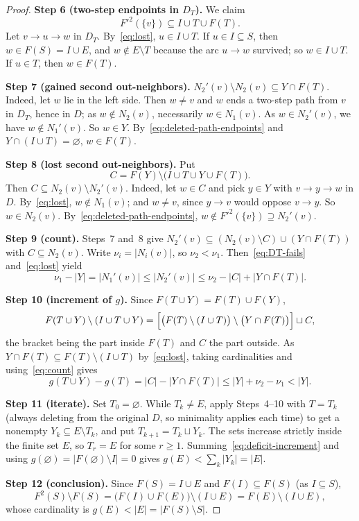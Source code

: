 \documentclass[11pt]{article}
\theoremstyle{remark}
\newcommand{\abs}[1]{\lvert #1\rvert}
\newcommand{\step}[1]{\par\smallskip\noindent\textbf{Step #1.}}
\begin{document}
\begin{proof}
\step{6 (two-step endpoints in $D_T$)} We claim
\begin{equation}
\label{eq:deleted-path-endpoints}
  F'^2(\{v\})\subseteq I\cup T\cup F(T).
\end{equation}
Let $v\to u\to w$ in $D_T$. By~\eqref{eq:lost}, $u\in I\cup T$. If
$u\in I\subseteq S$, then $w\in F(S)=I\cup E$, and $w\notin E\setminus T$
because the arc $u\to w$ survived; so $w\in I\cup T$. If $u\in T$, then
$w\in F(T)$.

\step{7 (gained second out-neighbors)}
$N_2'(v)\setminus N_2(v)\subseteq Y\cap F(T)$. Indeed, let $w$ lie in the left
side. Then $w\ne v$ and $w$ ends a two-step path from $v$ in $D_T$, hence in
$D$; as $w\notin N_2(v)$, necessarily $w\in N_1(v)$. As $w\in N_2'(v)$, we have
$w\notin N_1'(v)$. So $w\in Y$. By~\eqref{eq:deleted-path-endpoints} and
$Y\cap(I\cup T)=\varnothing$, $w\in F(T)$.

\step{8 (lost second out-neighbors)} Put
\[
  C=F(Y)\setminus\bigl(I\cup T\cup Y\cup F(T)\bigr).
\]
Then $C\subseteq N_2(v)\setminus N_2'(v)$. Indeed, let $w\in C$ and pick
$y\in Y$ with $v\to y\to w$ in $D$. By~\eqref{eq:lost}, $w\notin N_1(v)$; and
$w\ne v$, since $y\to v$ would oppose $v\to y$. So $w\in N_2(v)$.
By~\eqref{eq:deleted-path-endpoints},
$w\notin F'^2(\{v\})\supseteq N_2'(v)$.

\step{9 (count)} Steps~7 and~8 give
$N_2'(v)\subseteq(N_2(v)\setminus C)\cup(Y\cap F(T))$ with $C\subseteq N_2(v)$.
Write $\nu_i=\abs{N_i(v)}$, so $\nu_2<\nu_1$. Then~\eqref{eq:DT-fails}
and~\eqref{eq:lost} yield
\begin{equation}\label{eq:count}
  \nu_1-\abs{Y}=\abs{N_1'(v)}\le\abs{N_2'(v)}\le\nu_2-\abs{C}+\abs{Y\cap F(T)}.
\end{equation}

\step{10 (increment of $g$)} Since $F(T\cup Y)=F(T)\cup F(Y)$,
\[
 F(T\cup Y)\setminus(I\cup T\cup Y)
 =\Bigl[\bigl(F(T)\setminus(I\cup T)\bigr)\setminus\bigl(Y\cap F(T)\bigr)\Bigr]\sqcup C,
\]
the bracket being the part inside $F(T)$ and $C$ the part outside. As
$Y\cap F(T)\subseteq F(T)\setminus(I\cup T)$ by~\eqref{eq:lost}, taking
cardinalities and using~\eqref{eq:count} gives
\begin{equation}
\label{eq:deficit-increment}
  g(T\cup Y)-g(T)=\abs{C}-\abs{Y\cap F(T)}\le\abs{Y}+\nu_2-\nu_1<\abs{Y}.
\end{equation}

\step{11 (iterate)} Set $T_0=\varnothing$. While $T_k\ne E$, apply Steps~4--10
with $T=T_k$ (always deleting from the original $D$, so minimality applies each
time) to get a nonempty $Y_k\subseteq E\setminus T_k$, and put
$T_{k+1}=T_k\sqcup Y_k$. The sets increase strictly inside the finite set $E$,
so $T_r=E$ for some $r\ge1$. Summing~\eqref{eq:deficit-increment} and using
$g(\varnothing)=\abs{F(\varnothing)\setminus I}=0$ gives
$g(E)<\sum_k\abs{Y_k}=\abs{E}$.

\step{12 (conclusion)} Since $F(S)=I\cup E$ and $F(I)\subseteq F(S)$ (as
$I\subseteq S$),
\[
  F^2(S)\setminus F(S)=\bigl(F(I)\cup F(E)\bigr)\setminus(I\cup E)=F(E)\setminus(I\cup E),
\]
whose cardinality is $g(E)<\abs{E}=\abs{F(S)\setminus S}$.
\end{proof}
\end{document}
